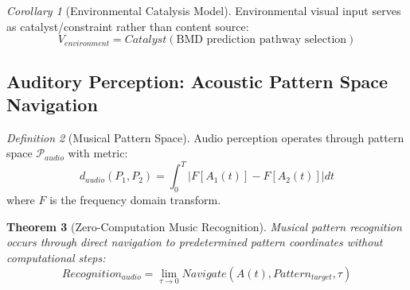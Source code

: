 \documentclass[12pt]{article}
\newtheorem{theorem}{Theorem}[section]
\newtheorem{corollary}[theorem]{Corollary}
\theoremstyle{definition}
\newtheorem{definition}[theorem]{Definition}
\theoremstyle{remark}
\newtheorem{corollary}[theorem]{Corollary}
\newtheorem{definition}[theorem]{Definition}
\begin{document}
\begin{corollary}[Environmental Catalysis Model]
Environmental visual input serves as catalyst/constraint rather than content source:
\begin{equation}
V_{environment} = Catalyst(\text{BMD prediction pathway selection})
\end{equation}
\end{corollary}

\subsection{Auditory Perception: Acoustic Pattern Space Navigation}
\label{sec:auditory}

\begin{definition}[Musical Pattern Space]
Audio perception operates through pattern space $\mathcal{P}_{audio}$ with metric:
\begin{equation}
d_{audio}(P_1, P_2) = \int_0^T |F[A_1(t)] - F[A_2(t)]| dt
\end{equation}
where $F$ is the frequency domain transform.
\end{definition}

\begin{theorem}[Zero-Computation Music Recognition]
Musical pattern recognition occurs through direct navigation to predetermined pattern coordinates without computational steps:
\begin{equation}
Recognition_{audio} = \lim_{\tau \to 0} Navigate(A(t), Pattern_{target}, \tau)
\end{equation}
\end{theorem}
\end{document}
